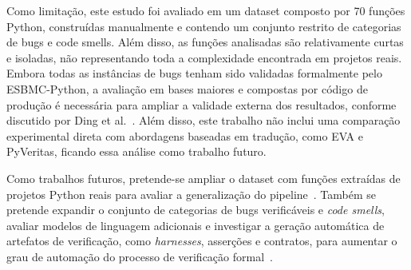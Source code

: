 \documentclass[sigconf]{acmart}
\begin{document}
Como limitação, este estudo foi avaliado em um dataset composto por 70 funções Python, construídas manualmente e contendo um conjunto restrito de categorias de bugs e code smells. Além disso, as funções analisadas são relativamente curtas e isoladas, não representando toda a complexidade encontrada em projetos reais. Embora todas as instâncias de bugs tenham sido validadas formalmente pelo ESBMC-Python, a avaliação em bases maiores e compostas por código de produção é necessária para ampliar a validade externa dos resultados, conforme discutido por Ding et al.~\cite{ding2025primevul}. Além disso, este trabalho não inclui uma comparação experimental direta com abordagens baseadas em tradução, como EVA e PyVeritas, ficando essa análise como trabalho futuro.


Como trabalhos futuros, pretende-se ampliar o dataset com funções extraídas de projetos Python reais para avaliar a generalização do pipeline~\cite{ding2025primevul}. Também se pretende expandir o conjunto de categorias de bugs verificáveis e \textit{code smells}, avaliar modelos de linguagem adicionais e investigar a geração automática de artefatos de verificação, como \textit{harnesses}, asserções e contratos, para aumentar o grau de automação do processo de verificação formal~\cite{shivaji2026eva,tihanyi2025vulnerability}.








\end{document}
